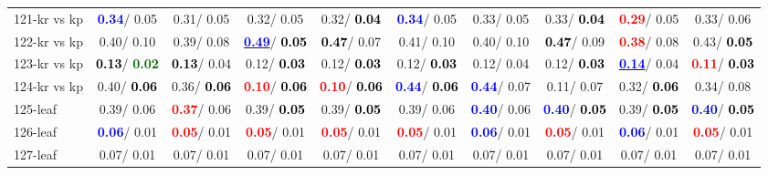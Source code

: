 \begin{table}[h]
\begin{center}
{\begin{tabular}{lc|c|c|c|c|c|c|c|c}
121-kr vs kp & \textcolor{blue}{\textbf{  0.34}}/  0.05 &   0.31/  0.05 &   0.32/  0.05 &   0.32/\textcolor{black}{\textbf{  0.04}} & \textcolor{blue}{\textbf{  0.34}}/  0.05 &   0.33/  0.05 &   0.33/\textcolor{black}{\textbf{  0.04}} & \textcolor{red}{\textbf{  0.29}}/  0.05 &   0.33/  0.06 \\
122-kr vs kp &   0.40/  0.10 &   0.39/  0.08 & \underline{\textcolor{blue}{\textbf{  0.49}}}/\textcolor{black}{\textbf{  0.05}} & \textcolor{black}{\textbf{  0.47}}/  0.07 &   0.41/  0.10 &   0.40/  0.10 & \textcolor{black}{\textbf{  0.47}}/  0.09 & \textcolor{red}{\textbf{  0.38}}/  0.08 &   0.43/\textcolor{black}{\textbf{  0.05}} \\
123-kr vs kp & \textcolor{black}{\textbf{  0.13}}/\textcolor{darkgreen}{\textbf{  0.02}} & \textcolor{black}{\textbf{  0.13}}/  0.04 &   0.12/\textcolor{black}{\textbf{  0.03}} &   0.12/\textcolor{black}{\textbf{  0.03}} &   0.12/\textcolor{black}{\textbf{  0.03}} &   0.12/  0.04 &   0.12/\textcolor{black}{\textbf{  0.03}} & \underline{\textcolor{blue}{\textbf{  0.14}}}/  0.04 & \textcolor{red}{\textbf{  0.11}}/\textcolor{black}{\textbf{  0.03}} \\
124-kr vs kp &   0.40/\textcolor{black}{\textbf{  0.06}} &   0.36/\textcolor{black}{\textbf{  0.06}} & \textcolor{red}{\textbf{  0.10}}/\textcolor{black}{\textbf{  0.06}} & \textcolor{red}{\textbf{  0.10}}/\textcolor{black}{\textbf{  0.06}} & \textcolor{blue}{\textbf{  0.44}}/\textcolor{black}{\textbf{  0.06}} & \textcolor{blue}{\textbf{  0.44}}/  0.07 &   0.11/  0.07 &   0.32/\textcolor{black}{\textbf{  0.06}} &   0.34/  0.08 \\ \hline
125-leaf &   0.39/  0.06 & \textcolor{red}{\textbf{  0.37}}/  0.06 &   0.39/\textcolor{black}{\textbf{  0.05}} &   0.39/\textcolor{black}{\textbf{  0.05}} &   0.39/  0.06 & \textcolor{blue}{\textbf{  0.40}}/  0.06 & \textcolor{blue}{\textbf{  0.40}}/\textcolor{black}{\textbf{  0.05}} &   0.39/\textcolor{black}{\textbf{  0.05}} & \textcolor{blue}{\textbf{  0.40}}/\textcolor{black}{\textbf{  0.05}} \\
126-leaf & \textcolor{blue}{\textbf{  0.06}}/  0.01 & \textcolor{red}{\textbf{  0.05}}/  0.01 & \textcolor{red}{\textbf{  0.05}}/  0.01 & \textcolor{red}{\textbf{  0.05}}/  0.01 & \textcolor{red}{\textbf{  0.05}}/  0.01 & \textcolor{blue}{\textbf{  0.06}}/  0.01 & \textcolor{red}{\textbf{  0.05}}/  0.01 & \textcolor{blue}{\textbf{  0.06}}/  0.01 & \textcolor{red}{\textbf{  0.05}}/  0.01 \\
127-leaf &   0.07/  0.01 &   0.07/  0.01 &   0.07/  0.01 &   0.07/  0.01 &   0.07/  0.01 &   0.07/  0.01 &   0.07/  0.01 &   0.07/  0.01 &   0.07/  0.01 \\

\end{tabular}}
\end{center}
\end{table}
